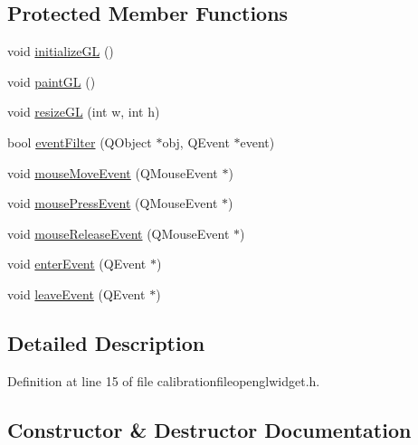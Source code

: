 \subsection*{Protected Member Functions}
\begin{DoxyCompactItemize}
\item 
void \mbox{\hyperlink{class_calibration_file_open_g_l_widget_a730d4f782ea760a8eba13766a56fde24}{initialize\+GL}} ()
\item 
void \mbox{\hyperlink{class_calibration_file_open_g_l_widget_a19d04cb22e142bfaf5c3fe801c302c12}{paint\+GL}} ()
\item 
void \mbox{\hyperlink{class_calibration_file_open_g_l_widget_ad63a6db7bf2c6cd347994e8755de8c18}{resize\+GL}} (int w, int h)
\item 
bool \mbox{\hyperlink{class_calibration_file_open_g_l_widget_a3dc3e4b6228a493a482acab878277c7a}{event\+Filter}} (Q\+Object $\ast$obj, Q\+Event $\ast$event)
\item 
void \mbox{\hyperlink{class_calibration_file_open_g_l_widget_ac3d8a78c94eefce97aa079410d33bc67}{mouse\+Move\+Event}} (Q\+Mouse\+Event $\ast$)
\item 
void \mbox{\hyperlink{class_calibration_file_open_g_l_widget_a9828d5b12688477eab2a0866cda50efd}{mouse\+Press\+Event}} (Q\+Mouse\+Event $\ast$)
\item 
void \mbox{\hyperlink{class_calibration_file_open_g_l_widget_a01f010d375221a076fb1fb3aee595669}{mouse\+Release\+Event}} (Q\+Mouse\+Event $\ast$)
\item 
void \mbox{\hyperlink{class_calibration_file_open_g_l_widget_a0b2b37302cfee8469ffb98aee4bf473a}{enter\+Event}} (Q\+Event $\ast$)
\item 
void \mbox{\hyperlink{class_calibration_file_open_g_l_widget_a71c31ee6aac4f9d7ad59fd80cf403d3d}{leave\+Event}} (Q\+Event $\ast$)
\end{DoxyCompactItemize}


\subsection{Detailed Description}


Definition at line 15 of file calibrationfileopenglwidget.\+h.



\subsection{Constructor \& Destructor Documentation}
\mbox{\label{class_calibration_file_open_g_l_widget_a21217e2e4c89c63b115fdc9805a490d5}} 
